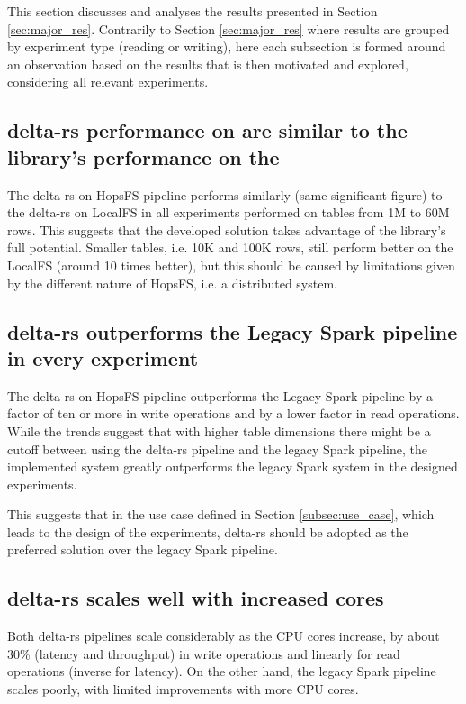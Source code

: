 This section discusses and analyses the results presented in Section \ref{sec:major_res}. Contrarily to Section \ref{sec:major_res} where results are grouped by experiment type (reading or writing), here each subsection is formed around an observation based on the results that is then motivated and explored, considering all relevant experiments.

\subsection{delta-rs performance on  are similar to the library's performance on the }

The delta-rs on \gls{HopsFS} pipeline performs similarly (same significant figure) to the delta-rs on \gls{LocalFS} in all experiments performed on tables from 1M to 60M rows. This suggests that the developed solution takes advantage of the library's full potential. Smaller tables, i.e. 10K and 100K rows, still perform better on the \gls{LocalFS} (around 10 times better), but this should be caused by limitations given by the different nature of \gls{HopsFS}, i.e. a distributed system.

\subsection{delta-rs outperforms the Legacy Spark pipeline in every experiment}

The delta-rs on \gls{HopsFS} pipeline outperforms the Legacy Spark pipeline by a factor of ten or more in write operations and by a lower factor in read operations. While the trends suggest that with higher table dimensions there might be a cutoff between using the delta-rs pipeline and the legacy Spark pipeline, the implemented system greatly outperforms the legacy Spark system in the designed experiments. 

This suggests that in the use case defined in Section \ref{subsec:use_case}, which leads to the design of the experiments, delta-rs should be adopted as the preferred solution over the legacy Spark pipeline.

\subsection{delta-rs scales well with increased  cores}

Both delta-rs pipelines scale considerably as the \gls{CPU} cores increase, by about 30\% (latency and throughput) in write operations and linearly for read operations (inverse for latency). On the other hand, the legacy Spark pipeline scales poorly, with limited improvements with more \gls{CPU} cores. 

